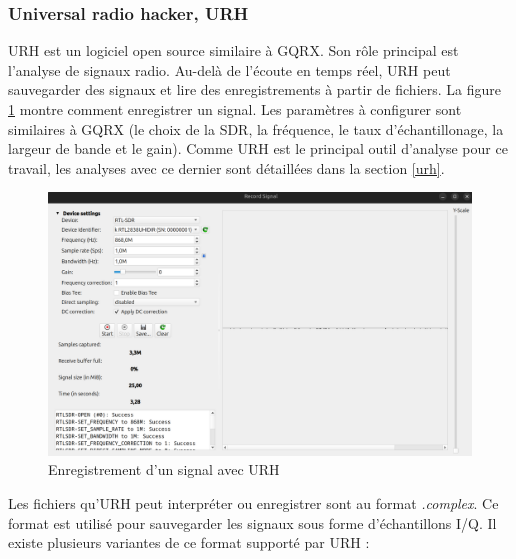 \subsubsection{Universal radio hacker, URH}


\ac{URH} est un logiciel open source similaire à GQRX. Son rôle principal est l'analyse de signaux radio. Au-delà de l'écoute en temps réel, \ac{URH} peut sauvegarder des signaux et lire des enregistrements à partir de fichiers. La figure \ref{term39} montre comment enregistrer un signal. Les paramètres à configurer sont similaires à GQRX (le choix de la \ac{SDR}, la fréquence, le taux d'échantillonage, la largeur de bande et le gain). Comme \ac{URH} est le principal outil d'analyse pour ce travail, les analyses avec ce dernier sont détaillées dans la section \ref{urh}.

\begin{figure}[h]
\centering

\includegraphics[scale=0.16]{images/urh1.png}
\caption{Enregistrement d'un signal avec URH}\label{term39}
\end{figure}

\newpage

Les fichiers qu'\ac{URH} peut interpréter ou enregistrer sont au format \textit{.complex}. Ce format est utilisé pour sauvegarder les signaux sous forme d'échantillons \ac{I/Q}. Il existe plusieurs variantes de ce format supporté par \ac{URH} :

\vspace{0.1cm}


